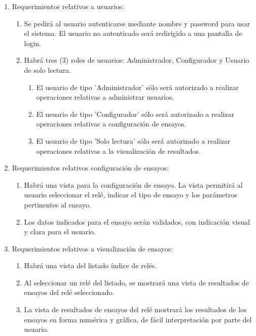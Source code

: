 \documentclass[11pt]{charter}
\begin{document}
\begin{enumerate}

\item Requerimientos relativos a usuarios:
	\begin{enumerate}
	\item Se pedirá al usuario autenticarse mediante nombre y password para usar el sistema. El usuario no autenticado será redirigido a una pantalla de login.
	\item Habrá tres (3) roles de usuarios: Administrador, Configurador y Usuario de solo lectura.
		\begin{enumerate}
		\item El usuario de tipo 'Administrador' sólo será autorizado a realizar operaciones relativas a administrar usuarios.
		\item El usuario de tipo 'Configurador' sólo será autorizado a realizar operaciones relativas a configuración de ensayos.
		\item El usuario de tipo 'Solo lectura' sólo será autorizado a realizar operaciones relativas a la visualización de resultados.
		\end{enumerate}
	\end{enumerate}

\item Requerimientos relativos configuración de ensayos:
	\begin{enumerate}
	\item Habrá una vista para la configuración de ensayo. La vista permitirá al usuario seleccionar el relé, indicar el tipo de ensayo y los parámetros pertinentes al ensayo.
	\item Los datos indicados para el ensayo serán validados, con indicación visual y clara para el usuario.
	\end{enumerate}

\item Requerimientos relativos a visualización de ensayos:
	\begin{enumerate}
	\item Habrá una vista del listado índice de relés.
	\item Al seleccionar un relé del listado, se mostrará una vista de resultados de ensayos del relé seleccionado.
	\item La vista de resultados de ensayos del relé mostrará los resultados de los ensayos en forma numérica y gráfica, de fácil interpretación por parte del usuario.
	\end{enumerate}


\end{enumerate}
\end{document}
